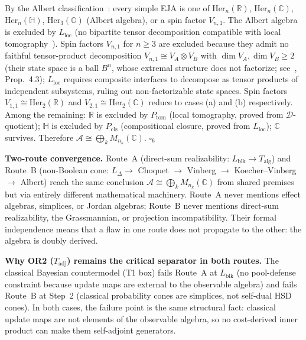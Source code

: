 \documentclass[11pt]{article}
\theoremstyle{remark}
\begin{document}
\begin{tcolorbox}[apfbox, title={Proposition T1-NB (Non-Boolean Bridge): $L_\Delta + L_{\mathrm{loc}} + \mathrm{OR1} + \mathrm{OR2} + \mathrm{OR3} \Rightarrow \mathcal{A} \cong \bigoplus_k M_{n_k}(\mathbb{C})$}]
By the Albert classification~\cite{Albert1934}: every simple EJA is one of $\mathrm{Her}_n(\mathbb{R})$, $\mathrm{Her}_n(\mathbb{C})$, $\mathrm{Her}_n(\mathbb{H})$, $\mathrm{Her}_3(\mathbb{O})$ (Albert algebra), or a spin factor $V_{n,1}$.  The Albert algebra is excluded by $L_{\mathrm{loc}}$ (no bipartite tensor decomposition compatible with local tomography~\cite{Wilce2018}).  Spin factors $V_{n,1}$ for $n \ge 3$ are excluded because they admit no faithful tensor-product decomposition $V_{n,1} \cong V_A \otimes V_B$ with $\dim V_A, \dim V_B \ge 2$ (their state space is a ball $B^n$, whose extremal structure does not factorize; see~\cite{Wilce2018}, Prop.~4.3); $L_{\mathrm{loc}}$ requires composite interfaces to decompose as tensor products of independent subsystems, ruling out non-factorizable state spaces.  Spin factors $V_{1,1} \cong \mathrm{Her}_2(\mathbb{R})$ and $V_{2,1} \cong \mathrm{Her}_2(\mathbb{C})$ reduce to cases (a) and (b) respectively.  Among the remaining:
$\mathbb{R}$ is excluded by $P_{\mathrm{tom}}$ (local tomography, proved from $\mathcal{D}$-quotient);
$\mathbb{H}$ is excluded by $P_{\mathrm{cls}}$ (compositional closure, proved from $L_{\mathrm{loc}}$);
$\mathbb{C}$ survives.  Therefore $\mathcal{A} \cong \bigoplus_k M_{n_k}(\mathbb{C})$.  \hfill$\square_6$
\end{tcolorbox}

\smallskip\noindent\textbf{Two-route convergence.}  Route~A (direct-sum realizability: $L_{\mathrm{blk}} \to T_{\mathrm{alg}}$) and Route~B (non-Boolean cone: $L_\Delta \to$ Choquet $\to$ Vinberg $\to$ Koecher--Vinberg $\to$ Albert) reach the same conclusion $\mathcal{A} \cong \bigoplus_k M_{n_k}(\mathbb{C})$ from shared premises but via entirely different mathematical machinery.  Route~A never mentions effect algebras, simplices, or Jordan algebras; Route~B never mentions direct-sum realizability, the Grassmannian, or projection incompatibility.  Their formal independence means that a flaw in one route does not propagate to the other: the algebra is doubly derived.

\smallskip\noindent\textbf{Why OR2 ($T_{\mathrm{adj}}$) remains the critical separator in both routes.}  The classical Bayesian countermodel (T1 box) fails Route~A at $L_{\mathrm{blk}}$ (no pool-defense constraint because update maps are external to the observable algebra) and fails Route~B at Step~2 (classical probability cones are simplices, not self-dual HSD cones).  In both cases, the failure point is the same structural fact: classical update maps are not elements of the observable algebra, so no cost-derived inner product can make them self-adjoint generators.
\end{document}
